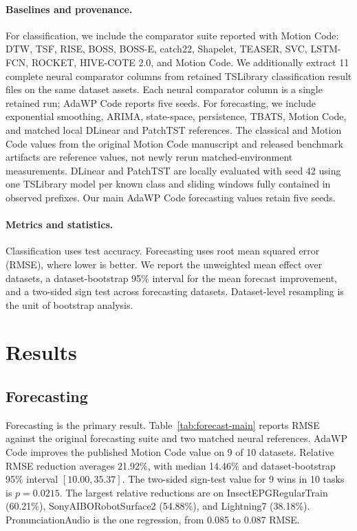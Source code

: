 \documentclass[11pt]{article}
\newcommand{\method}{AdaWP Code}
\newcommand{\mc}{Motion Code}
\begin{document}
\paragraph{Baselines and provenance.}
For classification, we include the comparator suite reported with \mc{}: DTW, TSF, RISE, BOSS, BOSS-E, catch22, Shapelet, TEASER, SVC, LSTM-FCN, ROCKET, HIVE-COTE 2.0, and \mc{}. We additionally extract 11 complete neural comparator columns from retained TSLibrary classification result files on the same dataset assets. Each neural comparator column is a single retained run; \method{} reports five seeds. For forecasting, we include exponential smoothing, ARIMA, state-space, persistence, TBATS, \mc{}, and matched local DLinear and PatchTST references. The classical and \mc{} values from the original \mc{} manuscript and released benchmark artifacts are reference values, not newly rerun matched-environment measurements. DLinear and PatchTST are locally evaluated with seed 42 using one TSLibrary model per known class and sliding windows fully contained in observed prefixes. Our main \method{} forecasting values retain five seeds.

\paragraph{Metrics and statistics.}
Classification uses test accuracy. Forecasting uses root mean squared error (RMSE), where lower is better. We report the unweighted mean effect over datasets, a dataset-bootstrap 95\% interval for the mean forecast improvement, and a two-sided sign test across forecasting datasets. Dataset-level resampling is the unit of bootstrap analysis.

\section{Results}

\subsection{Forecasting}

Forecasting is the primary result. Table~\ref{tab:forecast-main} reports RMSE against the original forecasting suite and two matched neural references. \method{} improves the published \mc{} value on 9 of 10 datasets. Relative RMSE reduction averages 21.92\%, with median 14.46\% and dataset-bootstrap 95\% interval $[10.00,35.37]$. The two-sided sign-test value for 9 wins in 10 tasks is $p=0.0215$. The largest relative reductions are on InsectEPGRegularTrain (60.21\%), SonyAIBORobotSurface2 (54.88\%), and Lightning7 (38.18\%). PronunciationAudio is the one regression, from 0.085 to 0.087 RMSE.
\end{document}
